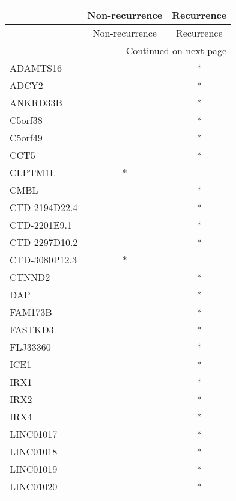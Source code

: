 \begin{longtable}{lcc}
\toprule
{} & Non-recurrence & Recurrence \\
\midrule
\endfirsthead

\toprule
{} & Non-recurrence & Recurrence \\
\midrule
\endhead
\midrule
\multicolumn{3}{r}{{Continued on next page}} \\
\midrule
\endfoot

\bottomrule
\endlastfoot
ADAMTS16      &                &          * \\
ADCY2         &                &          * \\
ANKRD33B      &                &          * \\
C5orf38       &                &          * \\
C5orf49       &                &          * \\
CCT5          &                &          * \\
CLPTM1L       &              * &            \\
CMBL          &                &          * \\
CTD-2194D22.4 &                &          * \\
CTD-2201E9.1  &                &          * \\
CTD-2297D10.2 &                &          * \\
CTD-3080P12.3 &              * &            \\
CTNND2        &                &          * \\
DAP           &                &          * \\
FAM173B       &                &          * \\
FASTKD3       &                &          * \\
FLJ33360      &                &          * \\
ICE1          &                &          * \\
IRX1          &                &          * \\
IRX2          &                &          * \\
IRX4          &                &          * \\
LINC01017     &                &          * \\
LINC01018     &                &          * \\
LINC01019     &                &          * \\
LINC01020     &                &          * \\

\end{longtable}
